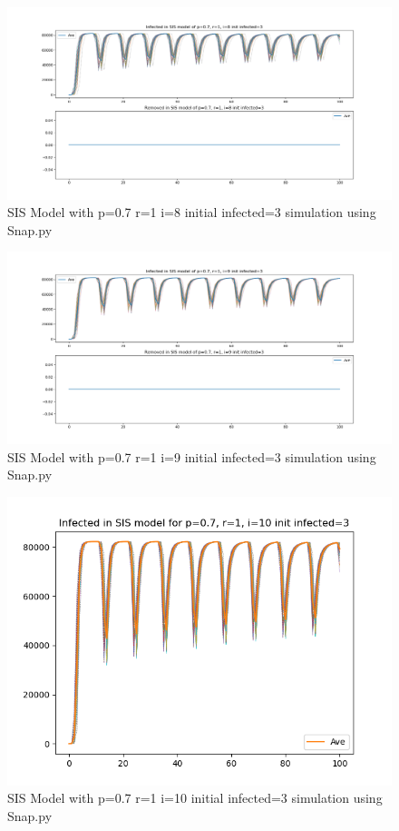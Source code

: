 \documentclass{subfile}
\begin{document}
  \begin{figure}
  \includegraphics[scale=0.8]{sisp07r1i8s3}
  \caption[SIS p=0.7,r=1,i=8,init infected=3]{SIS Model with p=0.7 r=1 i=8 initial infected=3 simulation using Snap.py}
  \end{figure}
  \begin{figure}
  \includegraphics[scale=0.8]{sisp07r1i9s3}
  \caption[SIS p=0.7,r=1,i=9,init infected=3]{SIS Model with p=0.7 r=1 i=9 initial infected=3 simulation using Snap.py}
  \end{figure}
  \begin{figure}
  \includegraphics[scale=0.8]{sisp07r1i10s3}
  \caption[SIS p=0.7,r=1,i=10,init infected=3]{SIS Model with p=0.7 r=1 i=10 initial infected=3 simulation using Snap.py}
  \end{figure}
\end{document}
